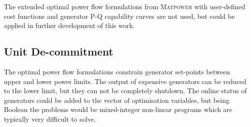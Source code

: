 The extended optimal power flow formulations from \textsc{Matpower} with
user-defined cost functions and generator P-Q capability curves are not used,
but could be applied in further development of this work.


\subsection{Unit De-commitment}
\label{sec:decommit}
The optimal power flow formulations constrain generator set-points between upper
and lower power limits.  The output of expensive generators can be reduced to
the lower limit, but they can not be completely shutdown.  The online status of
generators could be added to the vector of optimisation variables, but being
Boolean the problems would be mixed-integer non-linear programs which are
typically very difficult to solve.

